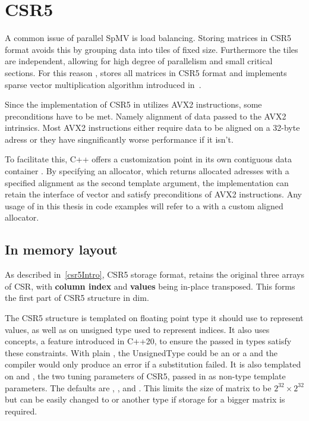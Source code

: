 \documentclass[thesis=M,english]{FITthesis}[2019/12/23]
\begin{document}
\section{CSR5}\label{impl:csr5}

A common issue of parallel SpMV is load balancing. Storing matrices in CSR5 format avoids this by
grouping data into tiles of fixed size. Furthermore the tiles are independent, allowing for high
degree of parallelism and small critical sections. For this reason , stores all matrices in
CSR5 format and implements sparse vector multiplication algorithm introduced in~\cite{liu2015csr5}.

Since the implementation of CSR5 in  utilizes AVX2 instructions, some preconditions have to be met.
Namely alignment of data passed to the AVX2 intrinsics. Most AVX2 instructions either require data to be
aligned on a 32-byte adress or they have singnificantly worse performance if it isn't.

To facilitate this, C++ offers a customization point in its own contiguous data container .
By specifying an allocator, which returns allocated adresses with a specified alignment as the second
template argument, the implementation can retain the interface of vector and satisfy preconditions of
AVX2 instructions. Any usage of  in this thesis in code examples will refer to a 
with a custom aligned allocator.

\subsection{In memory layout}

As described in~\ref{csr5Intro}, CSR5 storage format, retains the original three arrays of CSR, with
\textbf{column index} and \textbf{values} being in-place transposed. This forms the first part of
CSR5 structure in dim.

The CSR5 structure is templated on floating point type it should use to represent values,
as well as on unsigned type used to represent indices. It also uses concepts, a feature introduced in
C++20, to ensure the passed in types satisfy these constraints. With plain ,
the UnsignedType could be an  or  a  and the compiler
would only produce an error if a substitution failed. It is also templated on  and ,
the two tuning parameters of CSR5, passed in as non-type template parameters. The defaults are
, ,  and .
This limits the size of matrix to be \(2^{32}\times2^{32}\) but can be easily changed to  or
another type if storage for a bigger matrix is required.
\end{document}
